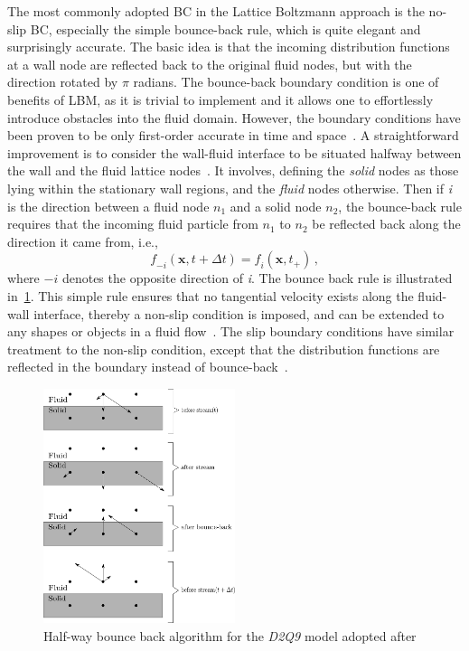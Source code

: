 The most commonly adopted BC in the Lattice Boltzmann approach 
is the no-slip BC, especially the simple bounce-back rule, 
which is quite elegant and surprisingly accurate. The basic 
idea is that the incoming distribution functions at a wall node 
are reflected back to the original fluid nodes, but with the 
direction rotated by $\pi$ radians. The bounce-back boundary 
condition is one of benefits of LBM, as it is trivial to 
implement and it allows one to effortlessly introduce obstacles 
into the fluid domain. However, the boundary conditions have 
been proven to be only first-order accurate in time and 
space~\citep{Pan2006}. A straightforward improvement is to 
consider the wall-fluid interface to be situated halfway 
between the wall and the fluid lattice 
nodes~\citep{Ziegler1993}. It involves, defining the 
\textit{solid} nodes as those lying within the stationary wall 
regions, and the \textit{fluid} nodes otherwise. Then if 
\textit{i} is the direction between a fluid node 
$\mathit{n}_{1}$ and a solid node $\mathit{n_2}$, the 
bounce-back rule requires that the incoming fluid particle from
$\mathit{n}_{1}$ to $\mathit{n}_{2}$ be reflected
back along the direction it came from, i.e.,
%
\begin{equation}
	\mathit{f}_{-\mathit{i}}(\mathbf{x}, \mathit{t}+\Delta \mathit{t}) = 
	\mathit{f_i}(\mathbf{x}, \mathit{t}_{+})\,,
\end{equation}
%
\noindent where $-\mathit{i}$ denotes the opposite direction of 
\textit{i}. The bounce back rule is illustrated 
in~\cref{fig:bounce}. This simple rule ensures that no 
tangential velocity exists along the fluid-wall interface, 
thereby a non-slip condition is imposed, and can be extended to 
any shapes or objects in a fluid flow~\citep{Han2007b,Zou1997}. 
The slip boundary conditions have similar treatment to the 
non-slip condition, except that the distribution functions are 
reflected in the boundary instead of 
bounce-back~\citep{Succi2001}.

\begin{figure}[htbp]
	\centering
	\includegraphics[width=0.5\textwidth]{bounce}
	\caption[Half-way bounce back algorithm for the \textit{D2Q9} model 
	]{Half-way 
	bounce back algorithm for the \textit{D2Q9} model adopted after 
	\citet{Sukop2006}}
	\label{fig:bounce}
\end{figure}

